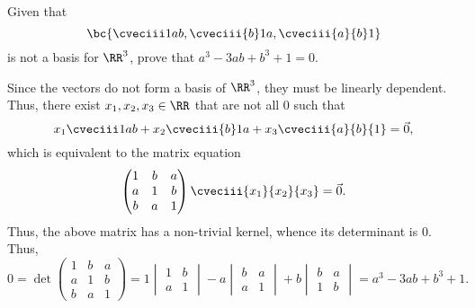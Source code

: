 \begin{problem}
    Given that \[\bc{\cveciii1ab, \cveciii{b}1a, \cveciii{a}{b}1}\] is not a basis for $\RR^3$, prove that $a^3 - 3ab + b^3 + 1 = 0$.
\end{problem}
\begin{solution}
    Since the vectors do not form a basis of $\RR^3$, they must be linearly dependent. Thus, there exist $x_1, x_2, x_3 \in \RR$ that are not all 0 such that \[x_1 \cveciii1ab + x_2 \cveciii{b}1a + x_3 \cveciii{a}{b}{1} = \vec 0,\] which is equivalent to the matrix equation \[\begin{pmatrix}1 & b & a \\ a & 1 & b \\ b & a & 1\end{pmatrix} \cveciii{x_1}{x_2}{x_3} = \vec 0.\] Thus, the above matrix has a non-trivial kernel, whence its determinant is 0. Thus, \[0 = \det \begin{pmatrix}1 & b & a \\ a & 1 & b \\ b & a & 1\end{pmatrix} = 1 \begin{vmatrix}1 & b \\ a & 1 \end{vmatrix} - a \begin{vmatrix}b & a \\ a & 1\end{vmatrix} + b \begin{vmatrix}b & a \\ 1 & b\end{vmatrix} = a^3 - 3ab + b^3 + 1.\]
\end{solution}

